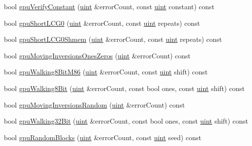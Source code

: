 \begin{DoxyCompactItemize}
\item 
bool \hyperlink{classmemtestState_a42398255d68ed1c278fae6908d375f56}{gpu\-Verify\-Constant} (\hyperlink{memtestG80__core_8h_a91ad9478d81a7aaf2593e8d9c3d06a14}{uint} \&error\-Count, const \hyperlink{memtestG80__core_8h_a91ad9478d81a7aaf2593e8d9c3d06a14}{uint} constant) const 
\item 
bool \hyperlink{classmemtestState_ac57927011fb55dd40c3df0725b726876}{gpu\-Short\-L\-C\-G0} (\hyperlink{memtestG80__core_8h_a91ad9478d81a7aaf2593e8d9c3d06a14}{uint} \&error\-Count, const \hyperlink{memtestG80__core_8h_a91ad9478d81a7aaf2593e8d9c3d06a14}{uint} repeats) const 
\item 
bool \hyperlink{classmemtestState_a96d2cd054a6eb5eae38f8c30066275f0}{gpu\-Short\-L\-C\-G0\-Shmem} (\hyperlink{memtestG80__core_8h_a91ad9478d81a7aaf2593e8d9c3d06a14}{uint} \&error\-Count, const \hyperlink{memtestG80__core_8h_a91ad9478d81a7aaf2593e8d9c3d06a14}{uint} repeats) const 
\item 
bool \hyperlink{classmemtestState_a0c2526f59e6cc19b0054982f6b979157}{gpu\-Moving\-Inversions\-Ones\-Zeros} (\hyperlink{memtestG80__core_8h_a91ad9478d81a7aaf2593e8d9c3d06a14}{uint} \&error\-Count) const 
\item 
bool \hyperlink{classmemtestState_a6a5b2323cec410859a5c0213e5bbc8fe}{gpu\-Walking8\-Bit\-M86} (\hyperlink{memtestG80__core_8h_a91ad9478d81a7aaf2593e8d9c3d06a14}{uint} \&error\-Count, const \hyperlink{memtestG80__core_8h_a91ad9478d81a7aaf2593e8d9c3d06a14}{uint} shift) const 
\item 
bool \hyperlink{classmemtestState_a7f2b0186f6163a45a28bd01595f91c11}{gpu\-Walking8\-Bit} (\hyperlink{memtestG80__core_8h_a91ad9478d81a7aaf2593e8d9c3d06a14}{uint} \&error\-Count, const bool ones, const \hyperlink{memtestG80__core_8h_a91ad9478d81a7aaf2593e8d9c3d06a14}{uint} shift) const 
\item 
bool \hyperlink{classmemtestState_a399b2dab70b2194f2ab678924e8ca8e1}{gpu\-Moving\-Inversions\-Random} (\hyperlink{memtestG80__core_8h_a91ad9478d81a7aaf2593e8d9c3d06a14}{uint} \&error\-Count) const 
\item 
bool \hyperlink{classmemtestState_a2a677a71239f67e502cc98b5f445a6dd}{gpu\-Walking32\-Bit} (\hyperlink{memtestG80__core_8h_a91ad9478d81a7aaf2593e8d9c3d06a14}{uint} \&error\-Count, const bool ones, const \hyperlink{memtestG80__core_8h_a91ad9478d81a7aaf2593e8d9c3d06a14}{uint} shift) const 
\item 
bool \hyperlink{classmemtestState_ad3209dd17f4603e9db5b5a22fc015bfb}{gpu\-Random\-Blocks} (\hyperlink{memtestG80__core_8h_a91ad9478d81a7aaf2593e8d9c3d06a14}{uint} \&error\-Count, const \hyperlink{memtestG80__core_8h_a91ad9478d81a7aaf2593e8d9c3d06a14}{uint} seed) const 

\end{DoxyCompactItemize}
